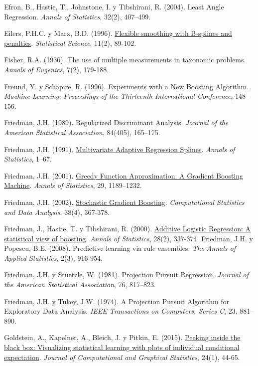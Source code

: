 \documentclass[
]{book}
\theoremstyle{break}
\theoremstyle{definition}
\theoremstyle{definition}
\theoremstyle{definition}
\theoremstyle{remark}
\begin{document}
Efron, B., Hastie, T., Johnstone, I. y Tibshirani, R. (2004). Least Angle Regression. \emph{Annals of Statistics}, 32(2), 407--499.

Eilers, P.H.C. y Marx, B.D. (1996). \href{https://www.jstor.org/stable/pdf/2246049.pdf}{Flexible smoothing with B-splines and penalties}. \emph{Statistical Science}, 11(2), 89-102.

Fisher, R.A. (1936). The use of multiple measurements in taxonomic problems. \emph{Annals of Eugenics}, 7(2), 179-188.

Freund, Y. y Schapire, R. (1996). Experiments with a New Boosting Algorithm. \emph{Machine Learning: Proceedings of the Thirteenth International Conference}, 148--156.

Friedman, J.H. (1989). Regularized Discriminant Analysis. \emph{Journal of the American Statistical Association}, 84(405), 165--175.

Friedman, J.H. (1991). \href{https://projecteuclid.org/euclid.aos/1176347963}{Multivariate Adaptive Regression Splines}. \emph{Annals of Statistics}, 1--67.

Friedman, J.H. (2001). \href{https://projecteuclid.org/euclid.aos/1013203451}{Greedy Function Approximation: A Gradient Boosting Machine}. \emph{Annals of Statistics}, 29, 1189--1232.

Friedman, J.H. (2002). \href{https://www.sciencedirect.com/science/article/pii/S0167947301000652}{Stochastic Gradient Boosting}. \emph{Computational Statistics and Data Analysis}, 38(4), 367-378.

Friedman, J., Hastie, T. y Tibshirani, R. (2000). \href{https://projecteuclid.org/euclid.aos/1016218223}{Additive Logistic Regression: A statistical view of boosting}. \emph{Annals of Statistics}, 28(2), 337-374.
Friedman, J.H. y Popescu, B.E. (2008). Predictive learning via rule ensembles. \emph{The Annals of Applied Statistics}, 2(3), 916-954.

Friedman, J.H. y Stuetzle, W. (1981). Projection Pursuit Regression. \emph{Journal of the American Statistical Association}, 76, 817--823.

Friedman, J.H. y Tukey, J.W. (1974). A Projection Pursuit Algorithm for Exploratory Data Analysis. \emph{IEEE Transactions on Computers, Series C}, 23, 881--890.

Goldstein, A., Kapelner, A., Bleich, J. y Pitkin, E. (2015). \href{https://doi.org/10.1080/10618600.2014.907095}{Peeking inside the black box: Visualizing statistical learning with plots of individual conditional expectation}. \emph{Journal of Computational and Graphical Statistics}, 24(1), 44-65.
\end{document}
